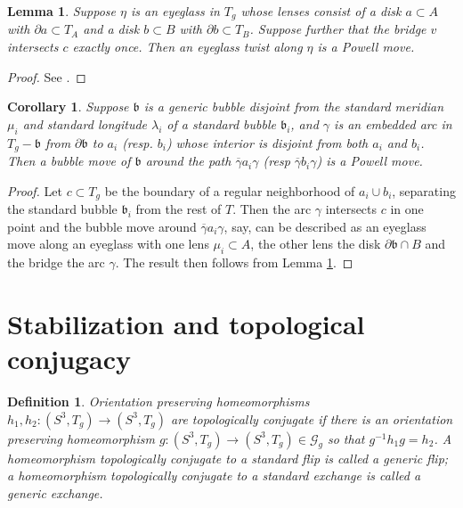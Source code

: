 \documentclass[12pt]{amsart}
\newtheorem{cor}[thm]{Corollary}
\newtheorem{defin}[thm]{Definition}
\newtheorem{lemma}[thm]{Lemma}
\newcommand{\calG}{\mathcal G}
\newcommand{\bdd}{\mbox{$\partial$}}
\newcommand{\frb}{\mathfrak{b}}
\begin{document}
\begin{lemma}  \label{lemma:eyeglass3o} Suppose $\eta$ is an eyeglass in $T_g$ whose lenses consist of a disk $a \subset A$ with $\bdd a \subset T_A$ and a disk $b \subset B$ with $\bdd b \subset T_B$.  Suppose further that the bridge $v$ intersects $c$ exactly once.  Then an eyeglass twist along $\eta$ is a Powell move. 
\end{lemma} 

\begin{proof} See \cite[Lemma 3.4]{FS1}.
\end{proof}

\begin{cor}  \label{cor:eyeglass3o}  Suppose $\frb$ is a generic bubble disjoint from the standard meridian $\mu_i$ and standard longitude $\lambda_i$ of a standard bubble $\frb_i$, and $\gamma$ is an embedded arc in $T_g - \frb$ from $\bdd \frb$ to $a_i$ (resp. $b_i$) whose interior is disjoint from both $a_i$ and $b_i$.   Then a bubble move  of $\frb$ around the path $\overline{\gamma} a_i\gamma$ (resp $\overline{\gamma} b_i \gamma$) is a Powell move.
\end{cor}

\begin{proof}  Let $c \subset T_g$ be the boundary of a regular neighborhood of $a_i \cup b_i$, separating the standard bubble $\frb_i$ from the rest of $T$.  Then the arc $\gamma$ intersects $c$ in one point and the bubble move around $\overline{\gamma} a_i\gamma$, say, can be described as an eyeglass move along an eyeglass with one lens $\mu_i \subset A$, the other lens the disk $\bdd \frb \cap B$ and the bridge the arc $\gamma$. The result then follows from Lemma \ref{lemma:eyeglass3o}.  
\end{proof}

\section{Stabilization and topological conjugacy}

\begin{defin} \label{defin:generic} Orientation preserving homeomorphisms $h_1, h_2: (S^3, T_g) \to (S^3, T_g)$ are {\em topologically conjugate} if there is an orientation preserving homeomorphism $g:(S^3, T_g) \to (S^3, T_g) \in \calG_g$ so that $g^{-1}h_1g = h_2$.  A homeomorphism topologically conjugate to a standard flip is called a {\em generic flip}; a homeomorphism topologically conjugate to a standard exchange is called a {\em generic exchange}.  
\end{defin}
\end{document}
